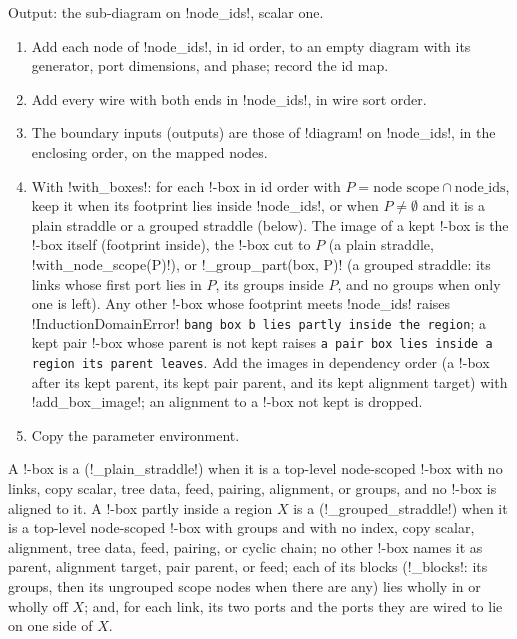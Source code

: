 \begin{algorithm}\label{alg:kernel-extract}
Output: the sub-diagram on \code!node_ids!, scalar one.
\begin{enumerate}
\item Add each node of \code!node_ids!, in id order, to an empty diagram with its generator, port dimensions, and phase; record the id map.
\item Add every wire with both ends in \code!node_ids!, in wire sort order.
\item The boundary inputs (outputs) are those of \code!diagram! on \code!node_ids!, in the enclosing order, on the mapped nodes.
\item With \code!with_boxes!: for each !-box in id order with $P = \text{node scope}\cap\text{node\_ids}$, keep it when its footprint lies inside \code!node_ids!, or when $P\neq\emptyset$ and it is a plain straddle or a grouped straddle (below). The image of a kept !-box is the !-box itself (footprint inside), the !-box cut to $P$ (a plain straddle, \py!with_node_scope(P)!), or \py!_group_part(box, P)! (a grouped straddle: its links whose first port lies in $P$, its groups inside $P$, and no groups when only one is left). Any other !-box whose footprint meets \code!node_ids! raises \py!InductionDomainError! \texttt{bang box b lies partly inside the region}; a kept pair !-box whose parent is not kept raises \texttt{a pair box lies inside a region its parent leaves}. Add the images in dependency order (a !-box after its kept parent, its kept pair parent, and its kept alignment target) with \py!add_box_image!; an alignment to a !-box not kept is dropped.
\item Copy the parameter environment.
\end{enumerate}
\end{algorithm}

\begin{definition}\label{def:kernel-straddle}
A !-box is a  (\py!_plain_straddle!) when it is a top-level node-scoped !-box with no links, copy scalar, tree data, feed, pairing, alignment, or groups, and no !-box is aligned to it. A !-box partly inside a region $X$ is a  (\py!_grouped_straddle!) when it is a top-level node-scoped !-box with groups and with no index, copy scalar, alignment, tree data, feed, pairing, or cyclic chain; no other !-box names it as parent, alignment target, pair parent, or feed; each of its blocks (\py!_blocks!: its groups, then its ungrouped scope nodes when there are any) lies wholly in or wholly off $X$; and, for each link, its two ports and the ports they are wired to lie on one side of $X$.
\end{definition}

